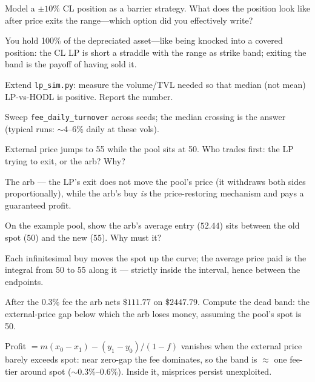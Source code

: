 \begin{exercise}[hard]
Model a $\pm10\%$ CL position as a barrier strategy. What does the position look like after
price exits the range---which option did you effectively write?
\end{exercise}
\begin{solution}
You hold 100\% of the depreciated asset---like being knocked into a covered position: the
CL LP is short a straddle with the range as strike band; exiting the band is the payoff of
having sold it.
\end{solution}

\begin{exercise}[hard]
Extend \texttt{lp\_sim.py}: measure the volume/TVL needed so that median (not mean)
LP-vs-HODL is positive. Report the number.
\end{exercise}
\begin{solution}
Sweep \texttt{fee\_daily\_turnover} across seeds; the median crossing is the answer
(typical runs: $\sim$4--6\% daily at these vols).
\end{solution}

\begin{exercise}[easy]
External price jumps to 55 while the pool sits at 50. Who trades
first: the LP trying to exit, or the arb? Why?
\end{exercise}
\begin{solution}
The arb --- the LP's exit does not move the pool's price (it
withdraws both sides proportionally), while the arb's buy
\emph{is} the price-restoring mechanism and pays a guaranteed
profit.
\end{solution}
\begin{exercise}[medium]
On the example pool, show the arb's average entry ($52.44$) sits
between the old spot ($50$) and the new ($55$). Why must it?
\end{exercise}
\begin{solution}
Each infinitesimal buy moves the spot up the curve; the average
price paid is the integral from 50 to 55 along it --- strictly
inside the interval, hence between the endpoints.
\end{solution}
\begin{exercise}[hard]
After the 0.3\% fee the arb nets $\$111.77$ on $\$2447.79$.
Compute the dead band: the external-price gap below which the arb
loses money, assuming the pool's spot is 50.
\end{exercise}
\begin{solution}
Profit $= m(x_0-x_1) - (y_1-y_0)/(1-f)$ vanishes when the external
price barely exceeds spot: near zero-gap the fee dominates, so the
band is $\approx$ one fee-tier around spot ($\sim$0.3\%--0.6\%).
Inside it, misprices persist unexploited.
\end{solution}

